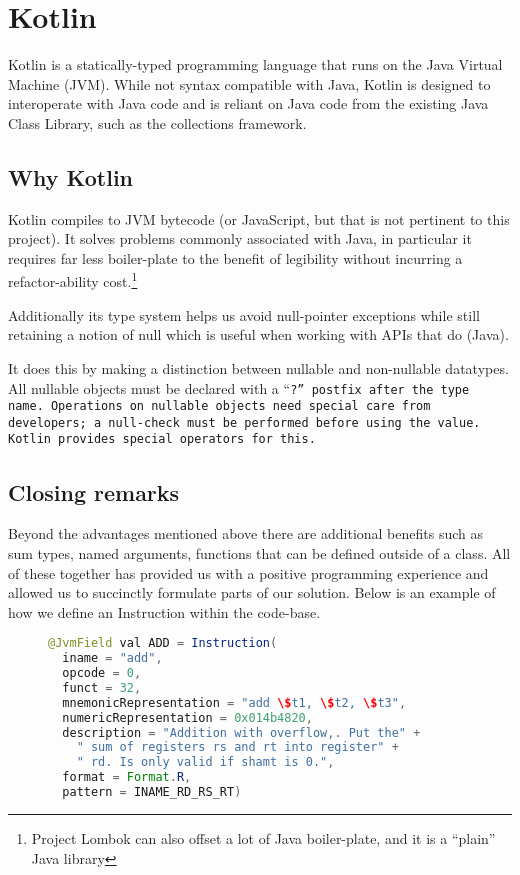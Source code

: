 \section{Kotlin}

Kotlin is a statically-typed programming language that runs on the
Java Virtual Machine (JVM). While not syntax compatible with Java,
Kotlin is designed to interoperate with Java code and is reliant on
Java code from the existing Java Class Library, such as the
collections framework.

\subsection{Why Kotlin}

Kotlin compiles to JVM bytecode (or JavaScript, but that is not
pertinent to this project). It solves problems commonly associated
with Java, in particular it requires far less boiler-plate to the
benefit of legibility without incurring a refactor-ability
cost.\footnote{Project Lombok can also offset a lot of Java
  boiler-plate, and it is a ``plain'' Java library}

Additionally its type system helps us avoid null-pointer exceptions
while still retaining a notion of null which is useful when working
with APIs that do (Java).

It does this by making a distinction between nullable and non-nullable
datatypes. All nullable objects must be declared with a ``\tt{?}''
postfix after the type name. Operations on nullable objects need
special care from developers; a null-check must be performed before
using the value. Kotlin provides special operators for this.

\subsection{Closing remarks}

Beyond the advantages mentioned above there are additional benefits
such as sum types, named arguments, functions that can be defined
outside of a class. All of these together has provided us with a
positive programming experience and allowed us to succinctly formulate
parts of our solution. Below is an example of how we define an
Instruction within the code-base.

\begin{figure}
\begin{lstlisting}[language=java, style=plain, caption=Kotlin --- applied]
@JvmField val ADD = Instruction(
  iname = "add",
  opcode = 0,
  funct = 32,
  mnemonicRepresentation = "add \$t1, \$t2, \$t3",
  numericRepresentation = 0x014b4820,
  description = "Addition with overflow,. Put the" +
    " sum of registers rs and rt into register" +
    " rd. Is only valid if shamt is 0.",
  format = Format.R,
  pattern = INAME_RD_RS_RT)
\end{lstlisting}
\end{figure}

